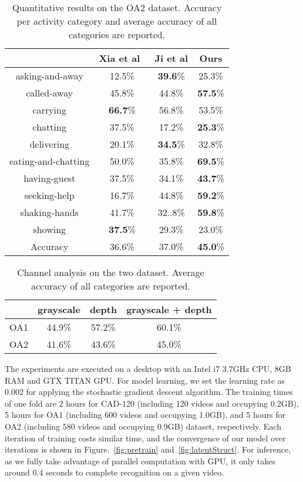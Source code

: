 \documentclass{sig-alternate}
\begin{document}
\begin{table}[!hbp]
\center
\begin{tabular}{|c|c|c|c|}
\hline
\hline
& Xia et al~\cite{DSTIP} &Ji et al\cite{3DCNNPAMI} & Ours \\
\hline
asking-and-away & 12.5\% & \textbf{39.6}\% & 25.3\% \\
called-away & 45.8\% & 44.8\% & \textbf{57.5}\% \\
carrying & \textbf{66.7}\% & 56.8\% & 53.5\% \\
chatting & 37.5\% & 17.2\% & \textbf{25.3}\% \\
delivering & 20.1\% & \textbf{34.5}\% & 32.8\% \\
eating-and-chatting & 50.0\% & 35.8\% & \textbf{69.5}\% \\
having-guest & 37.5\% & 34.1\% & \textbf{43.7}\% \\
seeking-help & 16.7\% & 44.8\% & \textbf{59.2}\% \\
shaking-hands & 41.7\% & 32..8\% & \textbf{59.8}\% \\
showing & \textbf{37.5}\% & 29.3\% & 23.0\% \\
\hline
\hline
Accuracy & 36.6\% & 37.0\% & \textbf{45.0}\% \\
\hline
\end{tabular}
\caption{ Quantitative results on the OA2 dataset. Accuracy per activity category and average accuracy of all categories are reported.}
\label{tab:hao2}
\end{table}

\begin{table}[!hbp]
\center
\begin{tabular}{|c|c|c|c|}
\hline
  & grayscale & depth & grayscale + depth \\
\hline
OA1 & 44.9\% & 57.2\% & 60.1\% \\
OA2 & 41.6\% & 43.6\% & 45.0\% \\  
\hline
\end{tabular}
\caption{ Channel analysis on the two dataset. Average accuracy of all categories are reported.}
\label{tab:channel}
\end{table}

The experiments are executed on a desktop with an Intel i7 3.7GHz CPU, 8GB RAM and GTX TITAN GPU. For model learning, we set the learning rate as $0.002$ for applying the stochastic gradient descent algorithm. The training times of one fold are 2 hours for CAD-120 (including 120 videos and occupying 0.2GB), 5 hours for OA1 (including 600 videos and occupying 1.0GB), and 5 hours for OA2 (including 580 videos and occupying 0.9GB) dataset, respectively. Each iteration of training costs similar time, and the convergence of our model over iterations is shown in Figure.~\ref{fig:pretrain} and~\ref{fig:latentStruct}. For inference, as we fully take advantage of parallel computation with GPU, it only takes around $0.4$ seconds to complete recognition on a given video.
\end{document}
